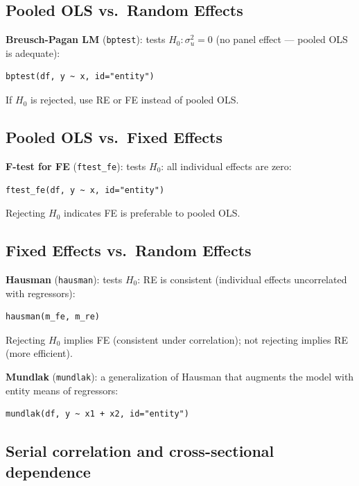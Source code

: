 \subsection{Pooled OLS vs.\ Random Effects}

\textbf{Breusch-Pagan LM} (\texttt{bptest}): tests $H_0: \sigma_u^2 = 0$
(no panel effect --- pooled OLS is adequate):

\begin{lstlisting}
bptest(df, y ~ x, id="entity")
\end{lstlisting}

If $H_0$ is rejected, use RE or FE instead of pooled OLS.

\subsection{Pooled OLS vs.\ Fixed Effects}

\textbf{F-test for FE} (\texttt{ftest\_fe}): tests $H_0$: all individual
effects are zero:

\begin{lstlisting}
ftest_fe(df, y ~ x, id="entity")
\end{lstlisting}

Rejecting $H_0$ indicates FE is preferable to pooled OLS.

\subsection{Fixed Effects vs.\ Random Effects}

\textbf{Hausman} (\texttt{hausman}): tests $H_0$: RE is consistent
(individual effects uncorrelated with regressors):

\begin{lstlisting}
hausman(m_fe, m_re)
\end{lstlisting}

Rejecting $H_0$ implies FE (consistent under correlation); not rejecting
implies RE (more efficient).

\textbf{Mundlak} (\texttt{mundlak}): a generalization of Hausman that
augments the model with entity means of regressors:

\begin{lstlisting}
mundlak(df, y ~ x1 + x2, id="entity")
\end{lstlisting}

\subsection{Serial correlation and cross-sectional dependence}

